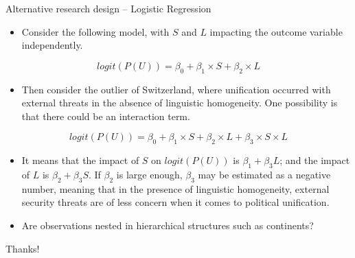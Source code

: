 \documentclass{beamer}
\begin{document}
	\begin{frame}{Alternative research design -- Logistic Regression}
		\begin{itemize}
			\item Consider the following model, with $S$ and $L$ impacting the outcome variable independently.
		\end{itemize}
		\begin{equation}
			logit(P(U))=\beta_0 + \beta_1 \times S + \beta_2 \times L
		\end{equation}
		\begin{itemize}
			\item Then consider the outlier of Switzerland, where unification occurred with external threats in the absence of linguistic homogeneity. One possibility is that there could be an interaction term.
		\end{itemize}
		\begin{equation}
			logit(P(U))=\beta_0 + \beta_1 \times S + \beta_2 \times L + \beta_3 \times S \times L
		\end{equation} 
		\begin{itemize}
			\item It means that the impact of $S$ on $logit(P(U))$ is $\beta_1+\beta_3 L$; and the impact of $L$ is $\beta_2+\beta_3 S$. If $\beta_2$ is large enough, $\beta_3$ may be estimated as a negative number, meaning that in the presence of linguistic homogeneity, external security threats are of less concern when it comes to political unification.
			\item Are observations nested in hierarchical structures such as continents?
		\end{itemize}
	\end{frame}


	\begin{frame}
		\centering\LARGE Thanks!
	\end{frame}
\end{document}
